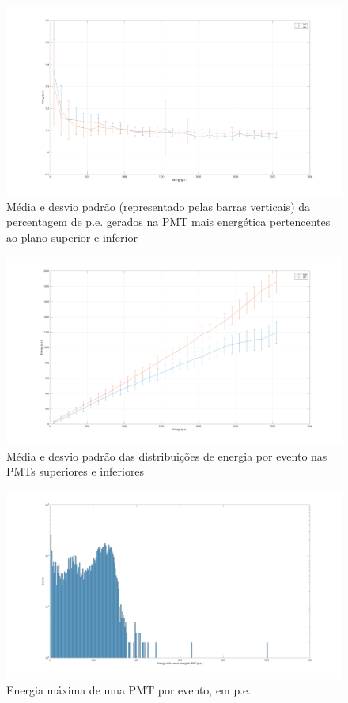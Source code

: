 \begin{figure}[H]
	\centering
	\includegraphics[width=16cm]{postextuais/apendice/dadosreais/errorbarene.png}
	\caption{Média e desvio padrão (representado pelas barras verticais) da percentagem de p.e. gerados na PMT mais energética pertencentes ao plano superior e inferior }
	\label{fig:transf}
\end{figure}

\begin{figure}[H]
	\centering
	\includegraphics[width=16cm]{postextuais/apendice/dadosreais/errorbarmosten.png}
	\caption{Média e desvio padrão das distribuições de energia por evento nas PMTs superiores e inferiores }
	\label{fig:transf}
\end{figure}

\begin{figure}[H]
	\centering
	\includegraphics[width=16cm]{postextuais/apendice/dadosreais/mosten_pmt.png}
	\caption{Energia máxima de uma PMT por evento, em p.e. }
	\label{fig:transf}
\end{figure}